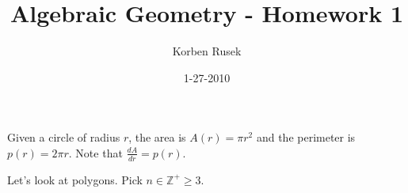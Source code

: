 \documentclass{article}
\author{Korben Rusek}
\title{Algebraic Geometry - Homework 1}
\date{1-27-2010}
\begin{document}
\maketitle
\newtheorem{problem}{Problem}
\newtheorem*{lemma}{Lemma}
\newtheorem*{remark}{Remark}
\newtheorem*{definition}{Definition}


\newcommand{\poly}[3]{#1_0+#1_1#2+\cdots+#1_{#3-1}#2^{#3-1}+#1_#3#2^#3}
\newcommand{\mpoly}[3]{#1_0+#1_1#2+\cdots+#1_{#3-1}#2^{#3-1}+#2^#3}
\newcommand{\apoly}[3]{|#1_0|+|#1_1||#2|+\cdots+|#1_{#3-1}||#2|^{#3-1}+|#1_#3||#2|^#3}
\newcommand{\gindex}[2]{|#1\!:\!#2|}
\newcommand{\lcm}{\operatorname{lcm}}
\newcommand{\irr}{\operatorname{irr}}
\newcommand{\sylp}{$Syl_{p}$}
\newcommand{\phnt}[1]{$\phantom{1}^{#1}$}
\newcommand{\gen}[1]{\langle#1\rangle}
\newcommand{\BA}{\mathbb{A}}
\newcommand{\BB}{\mathbb{B}}
\newcommand{\BP}{\mathbb{P}}
\newcommand{\BN}{\mathbb{N}}
\newcommand{\BZ}{\mathbb{Z}}
\newcommand{\BQ}{\mathbb{Q}}
\newcommand{\BR}{\mathbb{R}}
\newcommand{\BC}{\mathbb{C}}
\newcommand{\BF}{\mathbb{F}}
\newcommand{\CD}{\mathcal{D}}
\newcommand{\CF}{\mathcal{F}}
\newcommand{\CH}{\mathcal{H}}
\newcommand{\CQ}{\mathcal{Q}}
\newcommand{\fa}{\mathfrak{a}}
\newcommand{\fb}{\mathfrak{b}}
\newcommand{\fg}{\mathfrak{g}}
\newcommand{\fm}{\mathfrak{m}}
\newcommand{\fn}{\mathfrak{n}}
\newcommand{\fp}{\mathfrak{p}}
\newcommand{\fq}{\mathfrak{q}}
\newcommand{\FN}{\mathfrak{N}}
\newcommand{\FR}{\mathfrak{R}}
\newcommand{\FX}{\mathfrak{X}}
\newcommand{\set}[1]{\{#1\}}
\newcommand{\trv}{\set{1}}
\newcommand{\Aut}{\operatorname{Aut}}
\newcommand{\proj}{\operatorname{proj}}
\newcommand{\End}{\operatorname{End}}
\newcommand{\Ker}{\operatorname{Ker}}
\newcommand{\im}{\operatorname{Im}}
\newcommand{\chr}{\operatorname{char}}
\newcommand{\Spec}{\operatorname{Spec}}
\newcommand{\grad}{\operatorname{grad}}
\newcommand{\curl}{\operatorname{curl}}
\renewcommand{\div}{\operatorname{div}}
\newcommand{\sign}{\operatorname{sign}}
\newcommand{\spn}{\operatorname{span}}
\newcommand{\GL}{\operatorname{GL}}
\newcommand{\SL}{\operatorname{SL}}
\newcommand{\gl}{\mathfrak{gl}}
\newcommand{\fo}{\mathfrak{o}}
\newcommand{\Res}{\operatorname{Res}}
\newcommand{\Ann}{\operatorname{Ann}}
\newcommand{\subsetopen}
{\stackrel{\subset}
{\scriptscriptstyle\mathrm{ open}}}

Given a circle of radius $r$, the area is $A(r)=\pi r^2$ and the perimeter is $p(r)=2\pi r$.
Note that $\frac{dA}{dr}=p(r)$.

Let's look at polygons. Pick $n\in\BZ^+\ge 3$.
\end{document}
